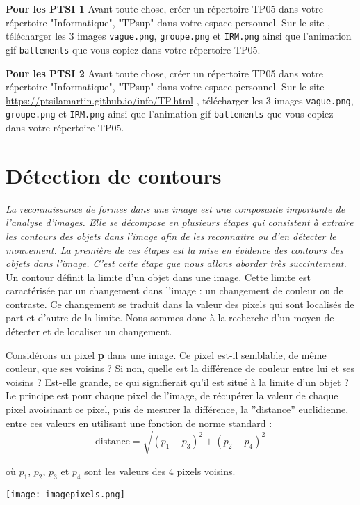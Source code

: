 

\textbf{Pour les PTSI 1}
Avant toute chose, créer un répertoire TP05 dans votre répertoire "Informatique", "TPsup" dans votre espace personnel. Sur le site \site, télécharger les 3  images \texttt{vague.png}, \texttt{groupe.png} et \texttt{IRM.png} ainsi que l'animation gif \texttt{battements} que vous copiez dans votre répertoire TP05.


\textbf{Pour les PTSI 2}
Avant toute chose, créer un répertoire TP05 dans votre répertoire "Informatique", "TPsup" dans votre espace personnel. Sur le site \url{https://ptsilamartin.github.io/info/TP.html} , télécharger les 3  images \texttt{vague.png}, \texttt{groupe.png} et \texttt{IRM.png} ainsi que l'animation gif \texttt{battements} que vous copiez dans votre répertoire TP05.



\section{Détection de contours}

\textit{La reconnaissance de formes dans une image est une composante importante de l’analyse d’images.
Elle se décompose en plusieurs étapes qui consistent à extraire les contours des objets dans l’image afin
de les reconnaitre ou d’en détecter le mouvement. La première de ces étapes est la mise en évidence
des contours des objets dans l’image. C’est cette étape que nous allons aborder très succintement.}
\\

Un contour définit la limite d’un objet dans une image. Cette limite est caractérisée par un changement
dans l'image : un changement de couleur ou de contraste. Ce changement se traduit dans la valeur des pixels qui sont localisés de part et d’autre de la limite.
Nous sommes donc à la recherche d’un moyen de détecter et de localiser un changement.\\

\begin{minipage}{.7\textwidth}%
Considérons un pixel \textbf{p} dans une image. Ce pixel est-il semblable, de même couleur, que ses voisins ? Si non, quelle est la différence de couleur entre lui et ses voisins ? Est-elle grande, ce qui signifierait qu’il est situé à la limite d’un objet ?\\
Le principe est pour chaque pixel de l'image, de récupérer la valeur de chaque pixel avoisinant ce pixel, puis de mesurer la différence, la ”distance” euclidienne, entre ces valeurs en utilisant une fonction de norme standard :
\begin{equation}
\text{distance} =\sqrt{(p_1-p_3)^2+(p_2-p_4)^2}
\end{equation} 

 où $ p_1$, $p_2$, $ p_3$ et $ p_4$ sont les valeurs des 4 pixels voisins.
 
\end{minipage}\hfill
\begin{minipage}{.25\textwidth}%
\texttt{[image: imagepixels.png]}
\end{minipage}





